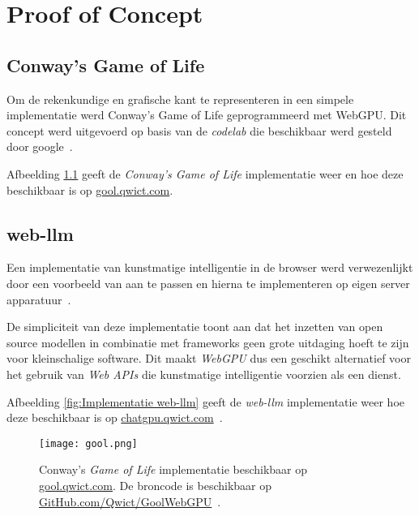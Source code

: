 \iffalse
TODO Dit moet verder in detail worden beschreven
\fi

\chapter{Proof of Concept}
\label{ch:poc}

\section{Conway's Game of Life}
\label{sec:gool}

Om de rekenkundige en grafische kant te representeren in een simpele implementatie werd Conway's Game of Life geprogrammeerd met WebGPU. Dit concept werd uitgevoerd op basis van de \textit{codelab} die beschikbaar werd gesteld door google~\autocite{google2023, Qwict2024}.

\bigbreak{}

Afbeelding \ref{fig:Conway's Game of Life} geeft de \textit{Conway's Game of Life} implementatie weer en hoe deze beschikbaar is op \href{https://gool.qwict.com}{gool.qwict.com}.

\section{web-llm}
\label{sec:chatgpu}

Een implementatie van kunstmatige intelligentie in de browser werd verwezenlijkt door een voorbeeld van \textcite{mlcai2023} aan te passen en hierna te implementeren op eigen server apparatuur~\autocite{Qwict2024a}.

\bigbreak{}

De simpliciteit van deze implementatie toont aan dat het inzetten van open source modellen in combinatie met frameworks geen grote uitdaging hoeft te zijn voor kleinschalige software. Dit maakt \textit{WebGPU} dus een geschikt alternatief voor het gebruik van \textit{Web APIs} die kunstmatige intelligentie voorzien als een dienst.

\bigbreak{}

Afbeelding \ref{fig:Implementatie web-llm} geeft de \textit{web-llm} implementatie weer hoe deze beschikbaar is op \href{https://chatgpu.qwict.com}{chatgpu.qwict.com}~\autocite{Qwict2024a}.

\break{}

\begin{figure}
    \texttt{[image: gool.png]}
    \caption[Conway's \textit{Game of Life} implementatie~\autocite{google2023, Qwict2024}]{
        Conway's \textit{Game of Life} implementatie beschikbaar op \href{https://gool.qwict.com}{gool.qwict.com}. De broncode is beschikbaar op \href{https://github.com/qwict/GoolWebGPU}{GitHub.com/Qwict/GoolWebGPU}~\autocite{google2023, Qwict2024}.
    }
    \label{fig:Conway's Game of Life}
\end{figure}

